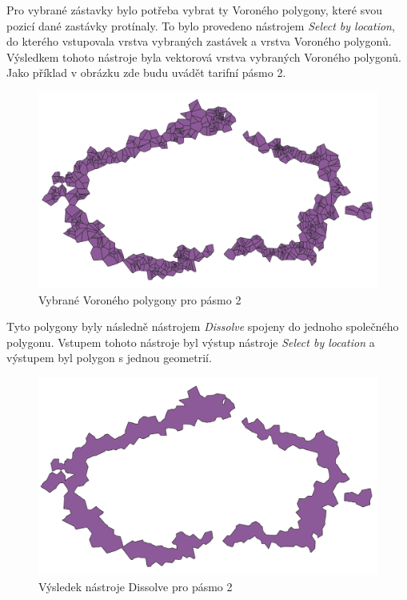Pro vybrané zástavky bylo potřeba vybrat ty Voroného polygony, které svou
pozicí dané zastávky protínaly. To bylo provedeno nástrojem \textit{Select by location},
do kterého vstupovala vrstva vybraných zastávek a vrstva Voroného polygonů. Výsledkem tohoto nástroje byla
vektorová vrstva vybraných Voroného polygonů. Jako příklad v obrázku zde budu uvádět tarifní pásmo 2.

\begin{figure}[H] \centering
    \includegraphics[width=400pt]{./pictures/voronoi-selected.png}
    \caption[Vybrané Voroného polygony pro pásmo 2]{Vybrané Voroného polygony pro pásmo 2}
	\label{fig:voronoi-selected}              
\end{figure}

Tyto polygony byly následně nástrojem \textit{Dissolve} spojeny do jednoho společného polygonu.
Vstupem tohoto nástroje byl výstup nástroje \textit{Select by location} a výstupem byl polygon
s jednou geometrií. 

\begin{figure}[H] \centering
    \includegraphics[width=400pt]{./pictures/dissolve.png}
    \caption[Výsledek nástroje Dissolve pro pásmo 2]{Výsledek nástroje Dissolve pro pásmo 2}
	\label{fig:dissolve}              
\end{figure} 

